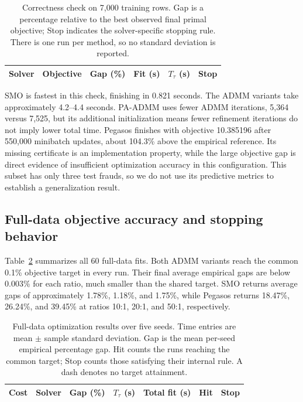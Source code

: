 \documentclass{article}
\begin{document}
\begin{table}[htbp]
\caption{Correctness check on 7,000 training rows. Gap is a percentage relative to the best observed final primal objective; Stop indicates the solver-specific stopping rule. There is one run per method, so no standard deviation is reported.}
\label{tab:correct}
\centering\small\setlength{\tabcolsep}{4pt}
\begin{tabular}{@{}lrrrrc@{}}
\toprule
Solver & Objective & Gap (\%) & Fit (s) & $T_\tau$ (s) & Stop\\
\midrule

\end{tabular}
\end{table}

SMO is fastest in this check, finishing in 0.821 seconds. The ADMM variants take approximately 4.2--4.4 seconds. PA-ADMM uses fewer ADMM iterations, 5,364 versus 7,525, but its additional initialization means fewer refinement iterations do not imply lower total time. Pegasos finishes with objective 10.385196 after 550,000 minibatch updates, about 104.3\% above the empirical reference. Its missing certificate is an implementation property, while the large objective gap is direct evidence of insufficient optimization accuracy in this configuration. This subset has only three test frauds, so we do not use its predictive metrics to establish a generalization result.

\subsection{Full-data objective accuracy and stopping behavior}

Table~\ref{tab:optimization} summarizes all 60 full-data fits. Both ADMM variants reach the common 0.1\% objective target in every run. Their final average empirical gaps are below 0.003\% for each ratio, much smaller than the shared target. SMO returns average gaps of approximately 1.78\%, 1.18\%, and 1.75\%, while Pegasos returns 18.47\%, 26.24\%, and 39.45\% at ratios 10:1, 20:1, and 50:1, respectively.

\begin{table}[htbp]
\caption{Full-data optimization results over five seeds. Time entries are mean $\pm$ sample standard deviation. Gap is the mean per-seed empirical percentage gap. Hit counts the runs reaching the common target; Stop counts those satisfying their internal rule. A dash denotes no target attainment.}
\label{tab:optimization}
\centering\small\setlength{\tabcolsep}{3.1pt}
\begin{tabular}{@{}llrrrrr@{}}
\toprule
Cost & Solver & Gap (\%) & $T_\tau$ (s) & Total fit (s) & Hit & Stop\\
\midrule

\end{tabular}
\end{table}
\end{document}
